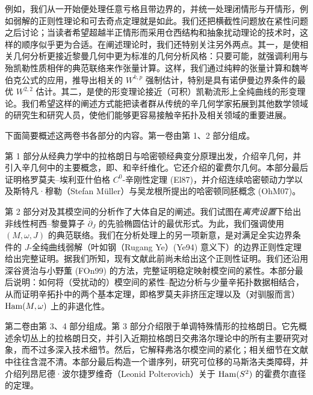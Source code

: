 例如，我们从一开始便处理任意亏格且带边界的\termPseudoholomorphicCurve，并统一处理闭情形与开情形，例如弱解的正则性理论和可去奇点定理就是如此。我们还把横截性问题放在紧性问题之后讨论；当读者希望超越半正情形而采用仓西结构和抽象扰动理论的技术时，这样的顺序似乎更为合适。在阐述\termPseudoholomorphicCurve{}理论时，我们还特别关注另外两点。其一，是使相关几何分析更接近黎曼几何中更为标准的几何分析风格：只要可能，就强调利用与殆凯勒性质相伴的典范联络来作张量计算。这样，我们通过纯粹的张量计算和魏岑伯克公式的应用，推导出相关的 $W^{k,p}$ 强制估计，特别是具有诺伊曼边界条件的最优 $W^{2,2}$ 估计。其二，是使\termPseudoholomorphicCurve{}的形变理论接近（可积）凯勒流形上全纯曲线的形变理论。我们希望这样的阐述方式能把读者群从传统的辛几何学家拓展到其他数学领域的研究生和研究人员，使他们能够更容易接触辛拓扑及相关领域的重要进展。

下面简要概述这两卷书各部分的内容。第一卷由第 1、2 部分组成。

第 1 部分从经典力学中的拉格朗日与哈密顿经典变分原理出发，介绍辛几何，并引入辛几何中的主要概念，即\termLagrangianSubmanifold、\termHamiltonianDiffeomorphism{}和辛纤维化。它还介绍\termHamiltonianDiffeomorphism{}的霍费尔几何。本部分最后证明格罗莫夫--埃利亚什伯格 $C^0$-辛刚性定理 (El87)，并介绍连续哈密顿动力学以及斯特凡·穆勒（Stefan Müller）与吴龙根所提出的哈密顿同胚概念 (OhM07)。

第 2 部分对\termPseudoholomorphicCurve{}及其模空间的分析作了大体自足的阐述。我们试图在\emph{离壳设置}下给出非线性柯西--黎曼算子 $\overline\partial_J$ 的先验椭圆估计的最优形式。为此，我们强调使用\termAlmostKahlerManifold $(M,\omega,J)$ 的典范联络。我们在分析处理上的另一项新意，是对满足全实边界条件的 $J$-全纯曲线弱解（叶如钢（Rugang Ye）(Ye94) 意义下）的边界正则性定理给出完整证明。据我们所知，现有文献此前尚未给出这个正则性证明。我们还沿用深谷贤治与小野薫 (FOn99) 的方法，完整证明稳定映射模空间的紧性。本部分最后说明：如何将（受扰动的）\termPseudoholomorphicCurve{}模空间的紧性--配边分析与少量辛拓扑数据相结合，从而证明辛拓扑中的两个基本定理，即格罗莫夫非挤压定理以及（对驯服\termSymplecticManifold{}而言）$\operatorname{Ham}(M,\omega)$ 上\termHoferNorm{}的非退化性。

第二卷由第 3、4 部分组成。第 3 部分介绍限于单调\termLagrangianSubmanifold{}特殊情形的拉格朗日\termFloerHomology。它先概述余切丛上的拉格朗日交\termFloerHomology，并引入近期拉格朗日交弗洛尔理论中的所有主要研究对象，而不过多深入技术细节。然后，它解释弗洛尔模空间的紧化；相关细节在文献中往往含混不清。本部分最后构造一个谱序列，研究可位移\termLagrangianSubmanifold{}的马斯洛夫类障碍，并介绍列昂尼德·波尔捷罗维奇（Leonid Polterovich）关于 $\operatorname{Ham}(S^2)$ 的霍费尔直径的定理。

